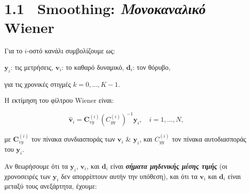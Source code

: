 \documentclass[12pt]{article} %
\begin{document}
\newpage


\section*{1.1 \ Smoothing: \textit{Μονοκαναλικό} Wiener}
\noindent Για το $i$-οστό κανάλι συμβολίζουμε ως:

\vspace{-10pt}

\begin{center}
    $\mathbf{y}_i$: τις μετρήσεις, \hspace{1cm}
    $\mathbf{v}_i$: το καθαρό δυναμικό, \hspace{1cm}
    $\mathbf{d}_i$: τον θόρυβο, 
\end{center}

\vspace{-10pt}

\noindent για τις χρονικές στιγμές $k = 0, \ldots, K - 1$.

\vspace{+10pt}

Η εκτίμηση του φίλτρου Wiener είναι:

\vspace{-10pt}

\[
\hat{\mathbf{v}}_i = \mathbf{C}_{vy}^{(i)}\left(C_{yy}^{(i)}\right)^{-1}\mathbf{y}_i, \quad i = 1,...,N,
\]

\vspace{-7pt}
\noindent με $\mathbf{C}_{vy}^{(i)}$ τον πίνακα συνδιασποράς των $\mathbf{v}_i$ \& $\mathbf{y}_i$, και $C_{yy}^{(i)}$ τον πίνακα αυτοδιασποράς του $\mathbf{y}_i$.


\vspace{+2pt}

\noindent Αν θεωρήσουμε ότι τα $\mathbf{y}_i$, $\mathbf{v}_i$, και $\mathbf{d}_i$ είναι \textbf{\textit{σήματα μηδενικής μέσης τιμής}} 
(οι χρονοσειρές των $\mathbf{y}_i$ δεν απορρίπτουν αυτήν την υπόθεση), 
και ότι τα $\mathbf{v}_i$ και $\mathbf{d}_i$ είναι μεταξύ τους ανεξάρτητα, έχουμε:
\end{document}
